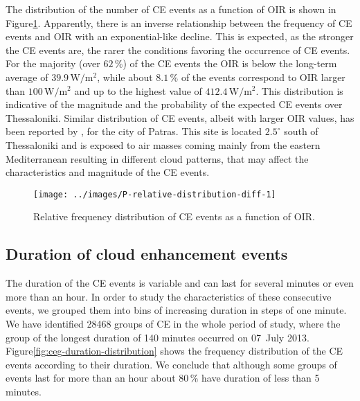 \documentclass[preprint, 5p,
authoryear]{elsarticle} %
\begin{document}
The distribution of the number of CE events as a function of OIR is
shown in Figure\nobreakspace{}\ref{fig:ovir-distribution}. Apparently,
there is an inverse relationship between the frequency of CE events and
OIR with an exponential-like decline. This is expected, as the stronger
the CE events are, the rarer the conditions favoring the occurrence of
CE events. For the majority (over \(62\,\%\)) of the CE events the OIR
is below the long-term average of \(39.9 \, \text{W} / \text{m}^2\),
while about \(8.1\,\%\) of the events correspond to OIR larger than
\(100\,\text{W}/\text{m}^2\) and up to the highest value of
\(412.4\,\text{W}/\text{m}^2\). This distribution is indicative of the
magnitude and the probability of the expected CE events over
Thessaloniki. Similar distribution of CE events, albeit with larger OIR
values, has been reported by \citet{Vamvakas2020}, for the city of
Patras. This site is located \(2.5^\circ\) south of Thessaloniki and is
exposed to air masses coming mainly from the eastern Mediterranean
resulting in different cloud patterns, that may affect the
characteristics and magnitude of the CE events.

\begin{figure}

{\centering \texttt{[image: ../images/P-relative-distribution-diff-1]} 

}

\caption{Relative frequency distribution of CE events as a function of OIR.}\label{fig:ovir-distribution}
\end{figure}

\hypertarget{duration-of-cloud-enhancement-events}{%
\subsection{Duration of cloud enhancement
events}\label{duration-of-cloud-enhancement-events}}

The duration of the CE events is variable and can last for several
minutes or even more than an hour. In order to study the characteristics
of these consecutive events, we grouped them into bins of increasing
duration in steps of one minute. We have identified 28468 groups of CE
in the whole period of study, where the group of the longest duration of
140 minutes occurred on 07~July 2013.
Figure\nobreakspace{}\ref{fig:ceg-duration-distribution} shows the
frequency distribution of the CE events according to their duration. We
conclude that although some groups of events last for more than an hour
about \(80\,\%\) have duration of less than 5 minutes.
\end{document}
